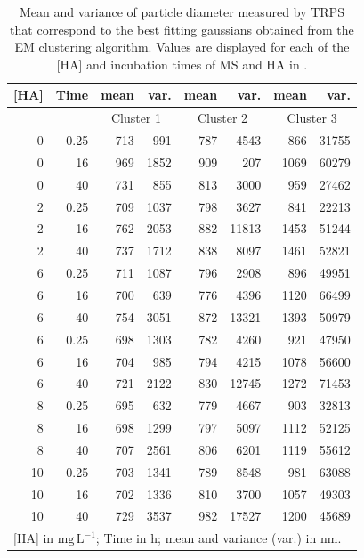 \documentclass[journal=langd5,manuscript=article]{achemso}
\begin{document}
\begin{table}
\label{tbl:sizes}
\caption{Mean and variance of particle diameter measured by TRPS that correspond to the best fitting gaussians obtained from the EM clustering algorithm. Values are displayed for each of the [HA] and incubation times of MS and HA in .}
\begin{tabular}{r r rr rr rr}
[HA] &Time &
mean  & var.  &
mean  & var.  &
mean  & var.  \\
\hline
& & \multicolumn{2}{c}{Cluster 1}&
\multicolumn{2}{c}{Cluster 2}&
\multicolumn{2}{c}{Cluster 3} \\
\hline  
 0 & 0.25 & 713 & 991 & 787 & 4543 & 866 & 31755 \\ 
 0 & 16 & 969 & 1852 & 909 & 207 & 1069 & 60279 \\ 
 0 & 40 & 731 & 855 & 813 & 3000 & 959 & 27462 \\ 
 2 & 0.25 & 709 & 1037 & 798 & 3627 & 841 & 22213 \\ 
 2 & 16 & 762 & 2053 & 882 & 11813 & 1453 & 51244 \\ 
 2 & 40 & 737 & 1712 & 838 & 8097 & 1461& 52821 \\ 
 6 & 0.25 & 711 & 1087 & 796 & 2908 & 896 & 49951 \\ 
 6 & 16 & 700 & 639 & 776 & 4396 & 1120 & 66499 \\ 
 6 & 40 & 754 & 3051 & 872 & 13321 & 1393 & 50979 \\ 
 6 & 0.25 & 698 & 1303 & 782 & 4260 & 921 & 47950 \\ 
 6 & 16 & 704 & 985 & 794 & 4215 & 1078 & 56600 \\ 
 6 & 40 & 721 & 2122 & 830 & 12745 & 1272 & 71453 \\ 
 8 & 0.25 & 695 & 632 & 779 & 4667 & 903 & 32813 \\ 
 8 & 16 & 698 & 1299 & 797 & 5097 & 1112 & 52125 \\ 
 8 & 40 & 707 & 2561 & 806 & 6201 & 1119 & 55612 \\ 
 10 & 0.25 & 703 & 1341 & 789 & 8548 & 981 & 63088 \\ 
 10 & 16 & 702 & 1336 & 810 & 3700 & 1057 & 49303 \\ 
 10 & 40 & 729 & 3537 & 982 & 17527 & 1200 & 45689 \\ 
\hline
\multicolumn{8}{l}{[HA] in $\mathrm{mg\,L^{-1}}$; Time in $\mathrm{h}$; mean and variance (var.) in $\mathrm{nm}$.} 
\end{tabular}
\end{table}


\end{document}
